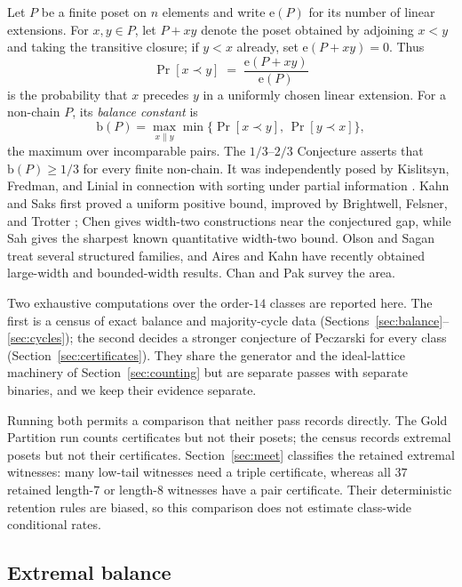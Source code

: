 \documentclass[11pt]{article}
\theoremstyle{definition}
\newcommand{\ext}{\mathrm{e}}
\newcommand{\bal}{\mathrm{b}}
\begin{document}
Let $P$ be a finite poset on $n$ elements and write $\ext(P)$ for its number
of linear extensions.  For $x,y\in P$, let $P+xy$ denote the poset obtained by
adjoining $x<y$ and taking the transitive closure; if $y<x$ already, set
$\ext(P+xy)=0$.  Thus
\[
  \Pr[x \prec y] \;=\; \frac{\ext(P+xy)}{\ext(P)}
\]
is the probability that $x$ precedes $y$ in a uniformly chosen linear
extension.  For a non-chain $P$, its \emph{balance constant} is
\[
  \bal(P)=
  \max_{x\parallel y}\min\{\Pr[x \prec y],\,\Pr[y \prec x]\},
\]
the maximum over incomparable pairs.  The $1/3$--$2/3$ Conjecture asserts that
$\bal(P)\geq1/3$ for every finite non-chain.  It was independently posed by
Kislitsyn, Fredman, and Linial in connection with sorting under partial
information \cite{kislitsyn,fredman,linial}.  Kahn and Saks \cite{kahn-saks}
first proved a uniform positive bound, improved by Brightwell, Felsner, and
Trotter \cite{bft}; Chen \cite{chen} gives width-two constructions near the
conjectured gap, while Sah \cite{sah} gives the sharpest known quantitative
width-two bound.  Olson and Sagan \cite{olson-sagan} treat several structured
families, and Aires and Kahn
\cite{aires-kahn,aires-kahn-bounded} have recently obtained large-width and
bounded-width results.  Chan and Pak \cite{chan-pak} survey the area.

Two exhaustive computations over the order-$14$ classes are reported here.
The first is a census of exact balance and majority-cycle data
(Sections~\ref{sec:balance}--\ref{sec:cycles}); the second decides a stronger
conjecture of Peczarski for every class (Section~\ref{sec:certificates}).
They share the generator and the ideal-lattice machinery of
Section~\ref{sec:counting} but are separate passes with separate binaries,
and we keep their evidence separate.

Running both permits a comparison that neither pass records directly.  The
Gold Partition run counts certificates but not their posets; the census
records extremal posets but not their certificates.  Section~\ref{sec:meet}
classifies the retained extremal witnesses: many low-tail witnesses need a
triple certificate, whereas all $37$ retained length-$7$ or length-$8$
witnesses have a pair certificate.  Their deterministic retention rules are
biased, so this comparison does not estimate class-wide conditional rates.

\subsection{Extremal balance}
\end{document}
